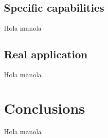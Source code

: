 \documentclass{beamer}
\begin{document}
\subsection{Specific capabilities}
\begin{frame}
Hola manola
\end{frame}
\subsection{Real application}
\begin{frame}
Hola manola
\end{frame}

\section{Conclusions}
\begin{frame}
Hola manola
\end{frame}



\end{document}
